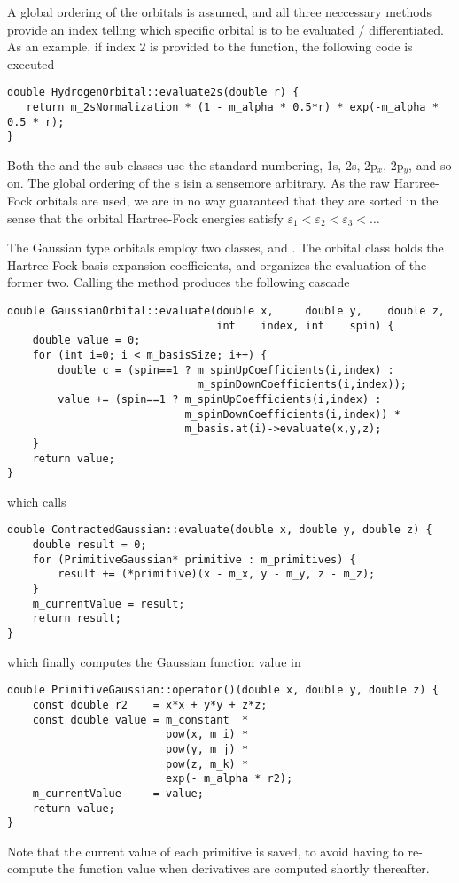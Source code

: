 \documentclass[../../master.tex]{subfiles}
\begin{document}
A global ordering of the orbitals is assumed, and all three neccessary methods provide an index telling which specific orbital is to be evaluated / differentiated. As an example, if index $2$ is provided to the  function, the following code is executed
\begin{lstlisting}[language={[std]c++}]
double HydrogenOrbital::evaluate2s(double r) {
   return m_2sNormalization * (1 - m_alpha * 0.5*r) * exp(-m_alpha * 0.5 * r);
}
\end{lstlisting}
Both the  and the  sub-classes use the standard numbering, 1s, 2s, 2p${}_x$, 2p${}_y$, and so on. The global ordering of the s is\textemdash in a sense\textemdash more arbitrary. As the raw Hartree-Fock orbitals are used, we are in no way guaranteed that they are sorted in the sense that the orbital Hartree-Fock energies satisfy $\varepsilon_1<\varepsilon_2<\varepsilon_3<\dots$

The Gaussian type orbitals employ two classes,  and . The orbital class holds the Hartree-Fock basis expansion coefficients, and organizes the evaluation of the former two. Calling the  method produces the following cascade
\begin{lstlisting}[language={[std]c++}]
double GaussianOrbital::evaluate(double x,     double y,    double z,
                                 int    index, int    spin) {
    double value = 0;
    for (int i=0; i < m_basisSize; i++) {
        double c = (spin==1 ? m_spinUpCoefficients(i,index) :
                              m_spinDownCoefficients(i,index));
        value += (spin==1 ? m_spinUpCoefficients(i,index) :
                            m_spinDownCoefficients(i,index)) * 
                            m_basis.at(i)->evaluate(x,y,z);
    }
    return value;
}
\end{lstlisting}
which calls 
\begin{lstlisting}[language={[std]c++}]
double ContractedGaussian::evaluate(double x, double y, double z) {
    double result = 0;
    for (PrimitiveGaussian* primitive : m_primitives) {
        result += (*primitive)(x - m_x, y - m_y, z - m_z);
    }
    m_currentValue = result;
    return result;
}
\end{lstlisting}
which finally computes the Gaussian function value in 
\begin{lstlisting}[language={[std]c++}]
double PrimitiveGaussian::operator()(double x, double y, double z) {
    const double r2    = x*x + y*y + z*z;
    const double value = m_constant  * 
                         pow(x, m_i) * 
                         pow(y, m_j) * 
                         pow(z, m_k) * 
                         exp(- m_alpha * r2);
    m_currentValue     = value;
    return value;
}
\end{lstlisting}
Note that the current value of each primitive is saved, to avoid having to re-compute the function value when derivatives are computed shortly thereafter.
\end{document}
